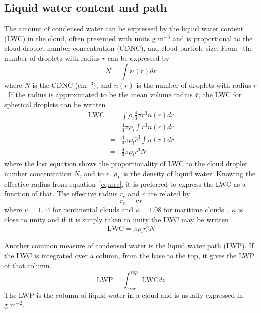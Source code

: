 \subsection{Liquid water content and path}
\label{sec:lwc}
The amount of condensed water can be expressed by the liquid water content (LWC) in the cloud, often presented with units $\text{g~m}^{-3}$ and is proportional to the cloud droplet number concentration (CDNC), and cloud particle size. From~\citet{Rogers1989} the number of droplets with radius $r$ can be expressed by
\begin{equation}
N = \int n(r) dr
\end{equation}
where $N$ is the CDNC ($\text{cm}^{-3}$), and $n(r)$ is the number of droplets with radius $r$. If the radius is approximated to be the mean volume radius $\overline{r}$, the LWC for spherical droplets can be written
\begin{eqnarray}
\text{LWC} &=& \int \rho_l \frac{4}{3} \pi r^3 n(r) dr\\
&=& \frac{4}{3} \pi \rho_l \int r^3 n(r) dr\\
&=& \frac{4}{3} \pi \rho_l \overline{r}^3 \int n(r) dr\\
&=& \frac{4}{3} \pi \rho_l \overline{r}^3 N 
\end{eqnarray}
where the last equation shows the proportionality of LWC to the cloud droplet number concentration $N$, and to $\overline{r}$. $\rho_L$ is the density of liquid water. Knowing the effective radius from equation~\ref{eqn:re}, it is preferred to express the LWC as a function of that. The effective radius $r_e$ and $\overline{r}$ are related by
\begin{equation}
r_e = \kappa \overline{r}
\end{equation}
where $\kappa = 1.14$ for continental clouds and $\kappa = 1.08$ for maritime clouds~\citep{Martin1994}. $\kappa$ is close to unity and if it is simply taken to unity the LWC may be written
\begin{equation}
\text{LWC} = \pi \rho_l r_e^3 N
\label{eqn:LWC}
\end{equation}

Another common measure of condensed water is the liquid water path (LWP).
If the LWC is integrated over a column, from the base to the top, it gives the LWP of that column.
\begin{equation}
\text{LWP} = \int_{base}^{top} \text{LWC} dz
\end{equation}
The LWP is the column of liquid water in a cloud and is usually expressed in $\text{g~m}^{-2}$.

